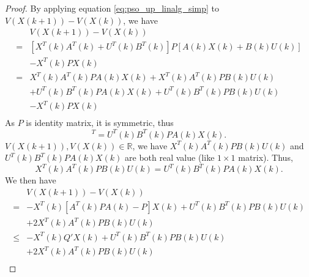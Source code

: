 \documentclass{sig-alternate}
\begin{document}
\begin{proof}
By applying equation \eqref{eq:pso_up_linalg_simp} to $ V( X(k+1) ) - V( X(k) ) $, we have
\begin{equation}
\label{eq:lyapunov_delta2}
\begin{aligned}
& V( X(k+1) ) - V( X(k) ) \\
= & [ X^{T}(k)  A^{T}(k) + U^{T}(k) B^{T}(k) ] P [ A(k) X(k) + B(k) U(k) ] \\ & - X^{T}(k) P X(k) \\
= & X^{T}(k)  A^{T}(k) P A(k) X(k) +  X^{T}(k)  A^{T}(k) P B(k) U(k) \\
& + U^{T}(k) B^{T}(k) P A(k) X(k) + U^{T}(k) B^{T}(k) P B(k) U(k) \\ & - X^{T}(k) P X(k) \\
\end{aligned}
\end{equation}
As $ P $ is identity matrix, it is symmetric, thus
\begin{equation}
[ X^{T}(k)  A^{T}(k) P B(k) U(k) ]^{T} =  U^{T}(k) B^{T}(k) P A(k) X(k).
\end{equation}
$ V( X(k+1) ) , V( X(k) ) \in \mathbb{R} $, 
we have $ X^{T}(k)  A^{T}(k) P B(k) U(k) $ and $  U^{T}(k) B^{T}(k) P A(k) X(k) $ are both real value (like $ 1 \times 1 $ matrix).
Thus, 
\begin{equation}
 X^{T}(k)  A^{T}(k) P B(k) U(k) =   U^{T}(k) B^{T}(k) P A(k) X(k) .
\end{equation}
We then have
\begin{equation}
\label{eq:lyapunov_delta3}
\begin{aligned}
& V( X(k+1) ) - V( X(k) ) \\
= & - X^{T}(k) [ A^{T}(k) P A(k) - P ] X(k) + U^{T}(k) B^{T}(k) P B(k) U(k)  \\
& + 2 X^{T}(k)  A^{T}(k) P B(k) U(k) \\
\leq & - X^{T}(k) Q' X(k)  + U^{T}(k) B^{T}(k) P B(k) U(k) \\
& + 2 X^{T}(k)  A^{T}(k) P B(k) U(k) \\

\end{aligned}
\end{equation}
\end{proof}
\end{document}
